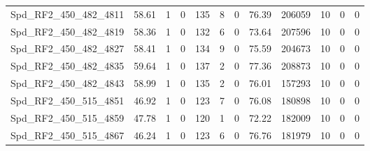 \begin{longtable}[c]{@{}lrrrrrrrrrrr@{}}
Spd\_RF2\_450\_482\_4811      & 58.61                  & 1                       & 0                       & 135                    & 8                       & 0                       & 76.39                   & 206059                   & 10                       & 0                        & 0                        \\
Spd\_RF2\_450\_482\_4819      & 58.36                  & 1                       & 0                       & 132                    & 6                       & 0                       & 73.64                   & 207596                   & 10                       & 0                        & 0                        \\
Spd\_RF2\_450\_482\_4827      & 58.41                  & 1                       & 0                       & 134                    & 9                       & 0                       & 75.59                   & 204673                   & 10                       & 0                        & 0                        \\
Spd\_RF2\_450\_482\_4835      & 59.64                  & 1                       & 0                       & 137                    & 2                       & 0                       & 77.36                   & 208873                   & 10                       & 0                        & 0                        \\
Spd\_RF2\_450\_482\_4843      & 58.99                  & 1                       & 0                       & 135                    & 2                       & 0                       & 76.01                   & 157293                   & 10                       & 0                        & 0                        \\
Spd\_RF2\_450\_515\_4851      & 46.92                  & 1                       & 0                       & 123                    & 7                       & 0                       & 76.08                   & 180898                   & 10                       & 0                        & 0                        \\
Spd\_RF2\_450\_515\_4859      & 47.78                  & 1                       & 0                       & 120                    & 1                       & 0                       & 72.22                   & 182009                   & 10                       & 0                        & 0                        \\
Spd\_RF2\_450\_515\_4867      & 46.24                  & 1                       & 0                       & 123                    & 6                       & 0                       & 76.76                   & 181979                   & 10                       & 0                        & 0                        \\

\end{longtable}
